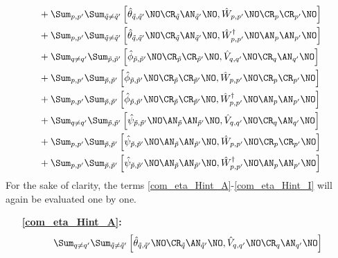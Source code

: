 \begin{appendix}
\begin{subequations}
\begin{align}
&+ \Sum_{p, p^\prime}\Sum_{\tilde q\neq\tilde q^\prime} \left[\hat\theta_{\tilde q,\tilde q^\prime}\NO\CR_{\tilde q}\AN_{\tilde q^\prime}\NO,\hat W_{p,p^\prime}\NO\CR_p\CR_{p^\prime}\NO\right] \label{com_eta_Hint_B} \\
&+ \Sum_{p, p^\prime}\Sum_{\tilde q\neq\tilde q^\prime} \left[\hat\theta_{\tilde q,\tilde q^\prime}\NO\CR_{\tilde q}\AN_{\tilde q^\prime}\NO,\hat W_{p,p^\prime}^\dagger\NO\AN_p\AN_{p^\prime}\NO\right] \label{com_eta_Hint_C} \\
&+ \Sum_{q\neq q^\prime}\Sum_{\tilde p,\tilde p^\prime} \left[\hat\phi_{\tilde p,\tilde p^\prime}\NO\CR_{\tilde p}\CR_{\tilde p^\prime}\NO,\hat V_{q,q^\prime}\NO\CR_q\AN_{q^\prime}\NO\right] \label{com_eta_Hint_D} \\
&+ \Sum_{p, p^\prime}\Sum_{\tilde p,\tilde p^\prime} \left[\hat\phi_{\tilde p,\tilde p^\prime}\NO\CR_{\tilde p}\CR_{\tilde p^\prime}\NO,\hat W_{p,p^\prime}\NO\CR_p\CR_{p^\prime}\NO\right]\label{com_eta_Hint_E}\\
&+ \Sum_{p, p^\prime}\Sum_{\tilde p,\tilde p^\prime} \left[\hat\phi_{\tilde p,\tilde p^\prime}\NO\CR_{\tilde p}\CR_{\tilde p^\prime}\NO,\hat W_{p,p^\prime}^\dagger\NO\AN_p\AN_{p^\prime}\NO\right]\label{com_eta_Hint_F}\\
&+ \Sum_{q\neq q^\prime}\Sum_{\tilde p,\tilde p^\prime} \left[\hat\psi_{\tilde p,\tilde p^\prime}\NO\AN_{\tilde p}\AN_{\tilde p^\prime}\NO,\hat V_{q,q^\prime}\NO\CR_q\AN_{q^\prime}\NO\right] \label{com_eta_Hint_G} \\
&+ \Sum_{p, p^\prime}\Sum_{\tilde p,\tilde p^\prime} \left[\hat\psi_{\tilde p,\tilde p^\prime}\NO\AN_{\tilde p}\AN_{\tilde p^\prime}\NO,\hat W_{p,p^\prime}\NO\CR_p\CR_{p^\prime}\NO\right]\label{com_eta_Hint_H}\\
&+ \Sum_{p, p^\prime}\Sum_{\tilde p,\tilde p^\prime} \left[\hat\psi_{\tilde p,\tilde p^\prime}\NO\AN_{\tilde p}\AN_{\tilde p^\prime}\NO,\hat W_{p,p^\prime}^\dagger\NO\AN_p\AN_{p^\prime}\NO\right]\label{com_eta_Hint_I}
\end{align}
\end{subequations}
For the sake of clarity, the terms \ref{com_eta_Hint_A}-\ref{com_eta_Hint_I} will again be evaluated one by one.
\begin{itemize}
\item[\textbf{\ref{com_eta_Hint_A}:}]
\begin{align}
&\Sum_{q\neq q^\prime}\Sum_{\tilde q\neq\tilde q^\prime} \left[\hat\theta_{\tilde q,\tilde q^\prime}\NO\CR_{\tilde q}\AN_{\tilde q^\prime}\NO,\hat V_{q,q^\prime}\NO\CR_q\AN_{q^\prime}\NO\right]\nonumber \\

\end{align}
\end{itemize}
\end{appendix}
